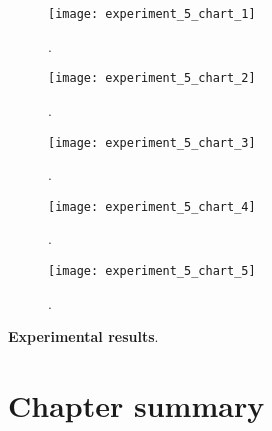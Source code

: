 \begin{figure}[H]
  \centering
  \texttt{[image: experiment\_5\_chart\_1]}
  \caption{.}
  \label{fig:???}
\end{figure}

\begin{figure}[H]
  \centering
  \texttt{[image: experiment\_5\_chart\_2]}
  \caption{.}
  \label{fig:???}
\end{figure}

\begin{figure}[H]
  \centering
  \texttt{[image: experiment\_5\_chart\_3]}
  \caption{.}
  \label{fig:???}
\end{figure}

\begin{figure}[H]
  \centering
  \texttt{[image: experiment\_5\_chart\_4]}
  \caption{.}
  \label{fig:???}
\end{figure}

\begin{figure}[H]
  \centering
  \texttt{[image: experiment\_5\_chart\_5]}
  \caption{.}
  \label{fig:???}
\end{figure}

\textbf{Experimental results}.

\section{Chapter summary}
